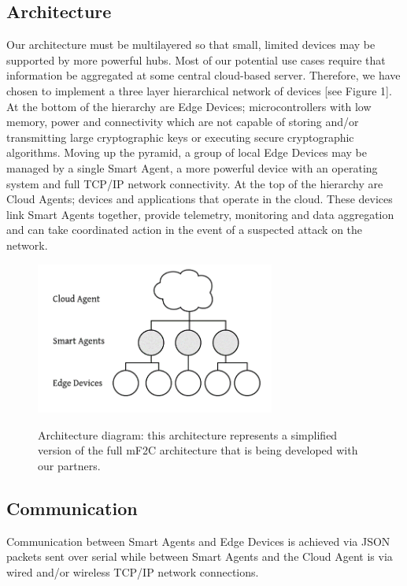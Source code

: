 \subsection{Architecture}

Our architecture must be multilayered so that small, limited devices may be supported by more powerful hubs. Most of our potential use cases require that information be aggregated at some central cloud-based server. Therefore, we have chosen to implement a three layer hierarchical network of devices [see Figure 1]. At the bottom of the hierarchy are Edge Devices; microcontrollers with low memory, power and connectivity which are not capable of storing and/or transmitting large cryptographic keys or executing secure cryptographic algorithms. Moving up the pyramid, a group of local Edge Devices may be managed by a single Smart Agent, a more powerful device with an operating system and full TCP/IP network connectivity. At the top of the hierarchy are Cloud Agents; devices and applications that operate in the cloud. These devices link Smart Agents together, provide telemetry, monitoring and data aggregation and can take coordinated action in the event of a suspected attack on the network.

\begin{figure}[h]
  \centering
    \includegraphics[width=0.7\textwidth]{simplified_architecture}
    \label{fig:simplified_architecture}
    \caption{Architecture diagram: this architecture represents a simplified version of the full mF2C architecture that is being developed with our partners.}
\end{figure}


\subsection{Communication}

Communication between Smart Agents and Edge Devices is achieved via JSON packets sent over serial while between Smart Agents and the Cloud Agent is via wired and/or wireless TCP/IP network connections.

